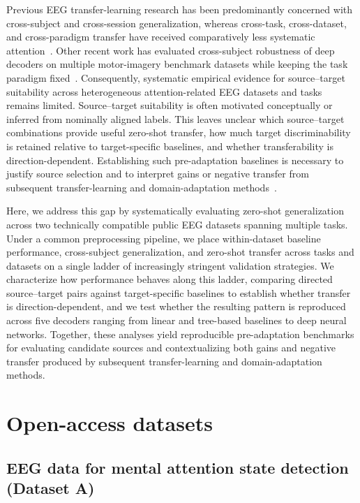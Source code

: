 \documentclass[10pt,letterpaper]{article}
\newcommand{\rev}[1]{#1}
\begin{document}
Previous EEG transfer-learning research has been predominantly concerned with cross-subject and cross-session generalization, whereas cross-task, cross-dataset, and cross-paradigm transfer have received comparatively less systematic attention~\cite{wu2022transfer,zhou2022crosstask,song2024signal}. Other recent work has evaluated cross-subject robustness of deep decoders on multiple motor-imagery benchmark datasets while keeping the task paradigm fixed~\cite{siino2025ratiowavenet}. Consequently, systematic empirical evidence for source--target suitability across heterogeneous attention-related EEG datasets and tasks remains limited. Source--target suitability is often motivated conceptually or inferred from nominally aligned labels. This leaves unclear which source--target combinations provide useful zero-shot transfer, how much target discriminability is retained relative to target-specific baselines, and whether transferability is direction-dependent. Establishing such pre-adaptation baselines is necessary to justify source selection and to interpret gains or negative transfer from subsequent transfer-learning and domain-adaptation methods~\cite{zhang2023negative}.


Here, we address this gap by systematically evaluating zero-shot generalization across two technically compatible public EEG datasets spanning multiple tasks. \rev{Under a common preprocessing pipeline, we place within-dataset baseline performance, cross-subject generalization, and zero-shot transfer across tasks and datasets on a single ladder of increasingly stringent validation strategies. We characterize how performance behaves along this ladder, comparing directed source--target pairs against target-specific baselines to establish whether transfer is direction-dependent, and we test whether the resulting pattern is reproduced across five decoders ranging from linear and tree-based baselines to deep neural networks.} Together, these analyses yield reproducible pre-adaptation benchmarks for evaluating candidate sources and contextualizing both gains and negative transfer produced by subsequent transfer-learning and domain-adaptation methods.


\section*{Open-access datasets}

\subsection*{EEG data for mental attention state detection (Dataset A)}
\end{document}
